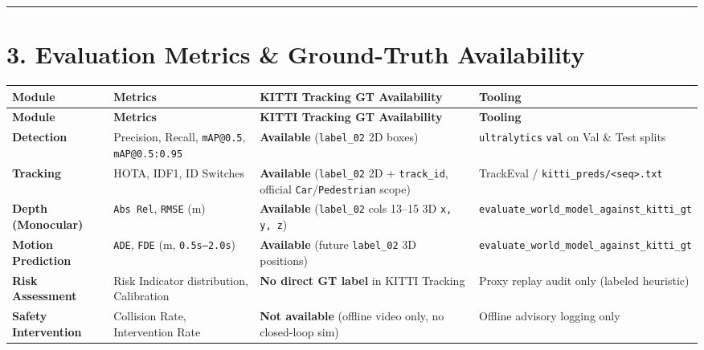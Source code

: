 \documentclass[10.5pt,a4paper]{article}
\begin{document}
\par\noindent\rule{\textwidth}{0.4pt}\par\medskip

\section{3. Evaluation Metrics \& Ground-Truth Availability}


\begin{footnotesize}
\setlength{\tabcolsep}{4pt}
\setlength{\LTleft}{0pt}\setlength{\LTright}{0pt}
\begin{longtable}{>{\raggedright\arraybackslash}p{} >{\raggedright\arraybackslash}p{} >{\raggedright\arraybackslash}p{} >{\raggedright\arraybackslash}p{}}
\toprule
\textbf{Module} & \textbf{Metrics} & \textbf{KITTI Tracking GT Availability} & \textbf{Tooling} \\
\midrule
\endfirsthead
\toprule
\textbf{Module} & \textbf{Metrics} & \textbf{KITTI Tracking GT Availability} & \textbf{Tooling} \\
\midrule
\endhead
\bottomrule
\endfoot
\textbf{Detection} & Precision, Recall, \texttt{mAP@0.\allowbreak{}5}, \texttt{mAP@0.\allowbreak{}5:\allowbreak{}0.\allowbreak{}95} & \textbf{Available} (\texttt{label\_\allowbreak{}02} 2D boxes) & \texttt{ultralytics} \texttt{val} on Val \& Test splits \\
\textbf{Tracking} & HOTA, IDF1, ID Switches & \textbf{Available} (\texttt{label\_\allowbreak{}02} 2D + \texttt{track\_\allowbreak{}id}, official \texttt{Car}/\texttt{Pedestrian} scope) & TrackEval / \texttt{kitti\_\allowbreak{}preds/\allowbreak{}<seq>.\allowbreak{}txt} \\
\textbf{Depth (Monocular)} & \texttt{Abs Rel}, \texttt{RMSE} (m) & \textbf{Available} (\texttt{label\_\allowbreak{}02} cols 13--15 3D \texttt{x,\allowbreak{} y,\allowbreak{} z}) & \texttt{evaluate\_\allowbreak{}world\_\allowbreak{}model\_\allowbreak{}against\_\allowbreak{}kitti\_\allowbreak{}gt} \\
\textbf{Motion Prediction} & \texttt{ADE}, \texttt{FDE} (m, \texttt{0.\allowbreak{}5s--2.\allowbreak{}0s}) & \textbf{Available} (future \texttt{label\_\allowbreak{}02} 3D positions) & \texttt{evaluate\_\allowbreak{}world\_\allowbreak{}model\_\allowbreak{}against\_\allowbreak{}kitti\_\allowbreak{}gt} \\
\textbf{Risk Assessment} & Risk Indicator distribution, Calibration & \textbf{No direct GT label} in KITTI Tracking & Proxy replay audit only (labeled heuristic) \\
\textbf{Safety Intervention} & Collision Rate, Intervention Rate & \textbf{Not available} (offline video only, no closed-loop sim) & Offline advisory logging only \\
\end{longtable}
\end{footnotesize}
\end{document}
